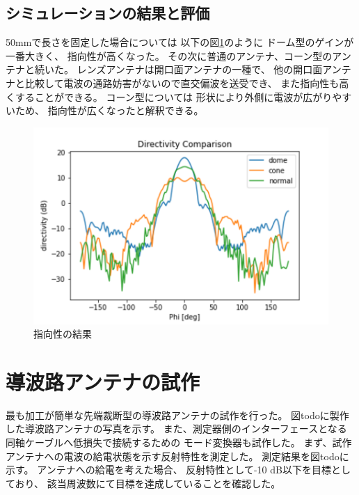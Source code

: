 \documentclass[technicalreport]{ieicej}
\begin{document}
\subsection{シミュレーションの結果と評価}

50mmで長さを固定した場合については
以下の図\ref{fig:directivity_results}のように
ドーム型のゲインが一番大きく、
指向性が高くなった。
その次に普通のアンテナ、コーン型のアンテナと続いた。
レンズアンテナは開口面アンテナの一種で、
他の開口面アンテナと比較して電波の通路妨害がないので直交偏波を送受でき、
また指向性も高くすることができる。
コーン型については
形状により外側に電波が広がりやすいため、
指向性が広くなったと解釈できる。

\begin{figure}[tb]
  \begin{center}
    \includegraphics[bb=0.000000 0.000000 432.098422 288.065615, width=1.0\linewidth]{img/directivity_comparison.pdf}
    \caption{指向性の結果}
    \label{fig:directivity_results}
  \end{center}
\end{figure}

\section{導波路アンテナの試作}

最も加工が簡単な先端裁断型の導波路アンテナの試作を行った。
図todoに製作した導波路アンテナの写真を示す。
また、測定器側のインターフェースとなる同軸ケーブルへ低損失で接続するための
モード変換器も試作した。
まず、試作アンテナへの電波の給電状態を示す反射特性を測定した。
測定結果を図todoに示す。
アンテナへの給電を考えた場合、
反射特性として-10 dB以下を目標としており、
該当周波数にて目標を達成していることを確認した。
\end{document}
